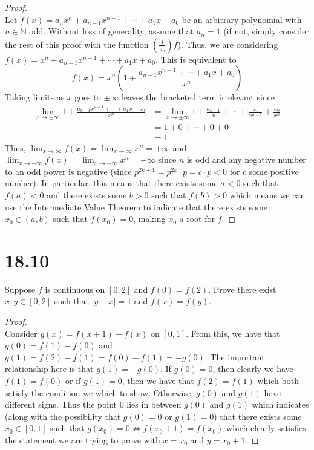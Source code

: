 \documentclass[10pt,a4paper]{article}
\theoremstyle{definition}
\begin{document}
\begin{proof}{$ $}
\\Let $f(x) = a_nx^n + a_{n - 1}x^{n-1} + \cdots + a_1x + a_0$ be an arbitrary polynomial with $n \in \mathbb{N}$ odd. Without loss of generality, assume that $a_n = 1$ (if not, simply consider the rest of this proof with the function $\left(\frac{1}{a_n}\right)f$). Thus, we are considering $f(x) = x^n + a_{n - 1}x^{n-1} + \cdots + a_1x + a_0$. This is equivalent to 
\begin{equation}
f(x) = x^n\left(1 + \frac{a_{n - 1}x^{n - 1} + \cdots + a_1x + a_0}{x^n}\right)
\end{equation}
Taking limits as $x$ goes to $\pm \infty$ leaves the bracketed term irrelevant since 
\begin{align*}
\lim_{x \to \pm \infty} 1 + \frac{a_{n - 1}x^{n - 1} + \cdots + a_1x + a_0}{x^n} &= \lim_{x \to \pm \infty} 1 + \frac{a_{n-1}}{x} + \cdots + \frac{a_1}{x^{n-1}} + \frac{a_0}{x^n}\\
&= 1 + 0 + \cdots + 0 + 0\\
&= 1.
\end{align*}
Thus, $\displaystyle \lim_{x \to \infty}f(x) = \lim_{x \to \infty} x^n = +\infty$ and $\displaystyle \lim_{x \to -\infty}f(x) = \lim_{x \to -\infty}x^n = -\infty$ since $n$ is odd and any negative number to an odd power is negative (since $p^{2k + 1} = p^{2k}\cdot p = c\cdot p < 0$ for $c$ some positive number). In particular, this means that there exists some $a < 0$ such that $f(a) < 0$ and there exists some $b > 0$ such that $f(b) > 0$ which means we can use the Intermediate Value Theorem to indicate that there exists some $x_0 \in (a,b)$ such that $f(x_0) = 0$, making $x_0$ a root for $f$.
\end{proof}

\section*{18.10}
Suppose $f$ is continuous on $[0,2]$ and $f(0) = f(2)$. Prove there exist $x,y \in [0,2]$ such that $|y - x| = 1$ and $f(x) = f(y)$. 

\begin{proof}{$ $}
\\Consider $g(x) = f(x + 1) - f(x)$ on $[0,1]$. From this, we have that $g(0) = f(1) - f(0)$ and $g(1) = f(2) - f(1) = f(0) - f(1) = -g(0)$. The important relationship here is that $g(1) = -g(0)$. If $g(0) = 0$, then clearly we have $f(1) = f(0)$ or if $g(1) = 0$, then we have that $f(2) = f(1)$ which both satisfy the condition we which to show. Otherwise, $g(0)$ and $g(1)$ have different signs. Thus the point $0$ lies in between $g(0)$ and $g(1)$ which indicates (along with the possibility that $g(0) = 0$ or $g(1) = 0$) that there exists some $x_0 \in [0,1]$ such that $g(x_0) = 0 \iff f(x_0 + 1) = f(x_0)$ which clearly satisfies the statement we are trying to prove with $x = x_0$ and $y = x_0 + 1$.
\end{proof}
\end{document}
